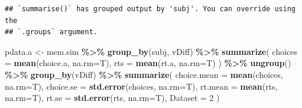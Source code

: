 \documentclass[
]{book}
\newenvironment{Shaded}{\begin{snugshade}}{\end{snugshade}}
\newcommand{\AttributeTok}[1]{\textcolor[rgb]{0.13,0.29,0.53}{#1}}
\newcommand{\DecValTok}[1]{\textcolor[rgb]{0.00,0.00,0.81}{#1}}
\newcommand{\FunctionTok}[1]{\textcolor[rgb]{0.13,0.29,0.53}{\textbf{#1}}}
\newcommand{\NormalTok}[1]{#1}
\newcommand{\OtherTok}[1]{\textcolor[rgb]{0.56,0.35,0.01}{#1}}
\newcommand{\SpecialCharTok}[1]{\textcolor[rgb]{0.81,0.36,0.00}{\textbf{#1}}}
\begin{document}
\begin{Shaded}
\end{Shaded}

\begin{verbatim}
## `summarise()` has grouped output by 'subj'. You can override using the
## `.groups` argument.
\end{verbatim}

\begin{Shaded}
\begin{Highlighting}[]
\NormalTok{pdata.a }\OtherTok{\textless{}{-}}\NormalTok{ mem.sim }\SpecialCharTok{\%\textgreater{}\%}
  \FunctionTok{group\_by}\NormalTok{(subj, vDiff) }\SpecialCharTok{\%\textgreater{}\%}
  \FunctionTok{summarize}\NormalTok{(}
    \AttributeTok{choices =} \FunctionTok{mean}\NormalTok{(choice.a, }\AttributeTok{na.rm=}\NormalTok{T),}
    \AttributeTok{rts =} \FunctionTok{mean}\NormalTok{(rt.a, }\AttributeTok{na.rm=}\NormalTok{T)}
\NormalTok{  ) }\SpecialCharTok{\%\textgreater{}\%}
  \FunctionTok{ungroup}\NormalTok{() }\SpecialCharTok{\%\textgreater{}\%}
  \FunctionTok{group\_by}\NormalTok{(vDiff) }\SpecialCharTok{\%\textgreater{}\%}
  \FunctionTok{summarize}\NormalTok{(}
    \AttributeTok{choice.mean =} \FunctionTok{mean}\NormalTok{(choices, }\AttributeTok{na.rm=}\NormalTok{T),}
    \AttributeTok{choice.se =} \FunctionTok{std.error}\NormalTok{(choices, }\AttributeTok{na.rm=}\NormalTok{T),}
    \AttributeTok{rt.mean =} \FunctionTok{mean}\NormalTok{(rts, }\AttributeTok{na.rm=}\NormalTok{T),}
    \AttributeTok{rt.se =} \FunctionTok{std.error}\NormalTok{(rts, }\AttributeTok{na.rm=}\NormalTok{T),}
    \AttributeTok{Dataset =} \DecValTok{2}
\NormalTok{  )}
\end{Highlighting}
\end{Shaded}
\end{document}
